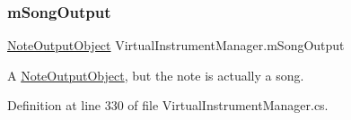 \subsubsection{\texorpdfstring{m\+Song\+Output}{mSongOutput}}
{\footnotesize\ttfamily \hyperlink{class_note_output_object}{Note\+Output\+Object} Virtual\+Instrument\+Manager.\+m\+Song\+Output\hspace{0.3cm}{\ttfamily [private]}}



A \hyperlink{class_note_output_object}{Note\+Output\+Object}, but the note is actually a song. 



Definition at line 330 of file Virtual\+Instrument\+Manager.\+cs.


